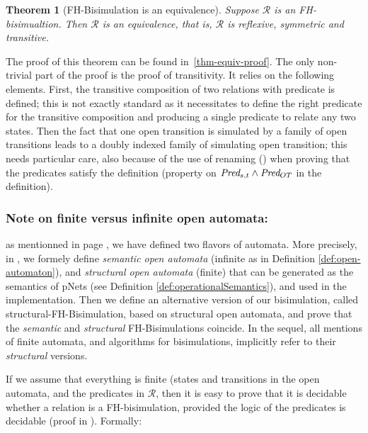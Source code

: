 \documentclass{lmcs}
\newcommand{\TODO}[1]{\textcolor{red}{\textbf{[TODO:#1]}}}
\newtheorem{theorem}{Theorem}
\begin{document}
\begin{theorem}[FH-Bisimulation is an equivalence]\label{thm-equiv} Suppose $\mathcal{R}$ 
is an FH-bisimualtion. Then $\mathcal{R}$ is an equivalence, that is, $\mathcal{R}$ is 
reflexive, symmetric and transitive.
\end{theorem}

The proof of this theorem can be found in~\ref{thm-equiv-proof}. The
only non-trivial part of the proof is the proof of transitivity. It
relies on the following elements. First,  the transitive composition
of two relations with predicate is defined; this is not exactly
standard as it necessitates to define the right predicate for the
transitive composition and producing a single predicate to relate any
two states. Then the fact that one open transition is simulated by a
family of open transitions leads to a doubly indexed family of
simulating open transition; this needs particular care, also because
of the use of renaming (\Post) when proving that the predicates
satisfy the definition (property on $\Pred_{s,t} \land \Pred_{OT}$ in
the definition).  


\medskip



\subsubsection*{Note on finite versus infinite open automata:} as
mentionned in page \pageref{def:open-automaton}, we have defined two flavors of
automata. More precisely, in \cite{hou:hal-02406098}, we formely define
\emph{semantic open automata} (infinite as in Definition \ref{def:open-automaton}),
and \emph{structural open automata} (finite) that can be generated as
the semantics of pNets (see Definition \ref{def:operationalSemantics}), and used in the implementation. Then we define
an alternative version of our bisimulation, called
structural-FH-Bisimulation, based on structural open automata, and
prove that the \emph{semantic} and \emph{structural} FH-Bisimulations coincide.
In the sequel, all mentions of finite automata, and algorithms for
bisimulations, implicitly refer to their \emph{structural} versions.

If we assume that everything is finite (states and transitions in the
open automata, and the predicates in $\mathcal{R}$, then it is easy to
prove that it is decidable whether a relation is a 
FH-bisimulation, provided the logic of the predicates is
decidable (proof in \cite{henrio:Forte2016}). Formally:
\end{document}
